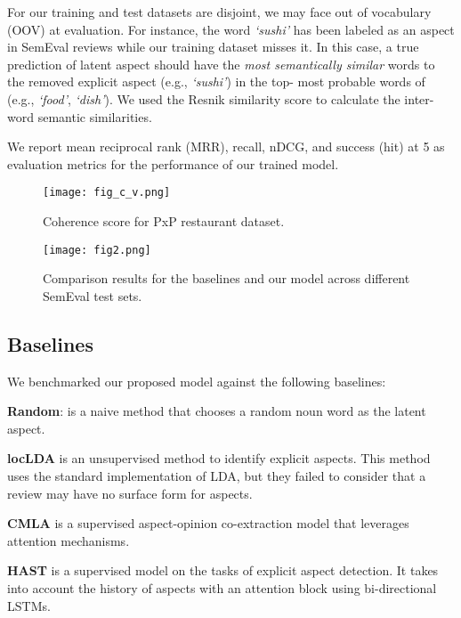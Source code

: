 \documentclass[11pt]{article}
\begin{document}
For our training and test datasets are disjoint, we may face out of vocabulary (OOV) at evaluation. For instance, the word \textit{`sushi'} has been labeled as an aspect in SemEval reviews while our training dataset misses it. In this case, a true prediction of latent aspect  should have the \textit{most semantically similar} words to the removed explicit aspect (e.g., \textit{`sushi'}) in the top- most probable words of  (e.g., \textit{`food'},\textit{ `dish'}). We used the Resnik similarity score \cite{Resnik_1999} to calculate the inter-word semantic similarities. 

We report mean reciprocal rank (MRR), recall,  nDCG,  and success (hit) at 5 as evaluation metrics for the performance of our trained model. 
\begin{figure}
\centering
\texttt{[image: fig\_c\_v.png]}

\caption{Coherence score for PxP restaurant dataset.}
\label{fig:coherence}
\end{figure}









\begin{figure*}[!ht]
\centering
\texttt{[image: fig2.png]}

\caption{Comparison results for the baselines and our model across different SemEval test sets.}
\label{fig:experimet_results}
\end{figure*}
\subsection{Baselines}
We benchmarked our proposed model against the following baselines:

\noindent\textbf{Random}: is a naive method that chooses a random noun word as the latent aspect.

\noindent\textbf{locLDA} \cite{Brody_2010} is an unsupervised method to identify explicit aspects. This method uses the standard implementation of LDA, but they failed to consider that a review may have no surface form for aspects.

\noindent\textbf{CMLA} \cite{Wang_2017} is a supervised aspect-opinion co-extraction model that leverages attention mechanisms. 

\noindent\textbf{HAST} \cite{LiBLLY18} is a supervised model on the tasks of explicit aspect detection. It takes into account the history of aspects with an attention block using bi-directional LSTMs.
\end{document}
